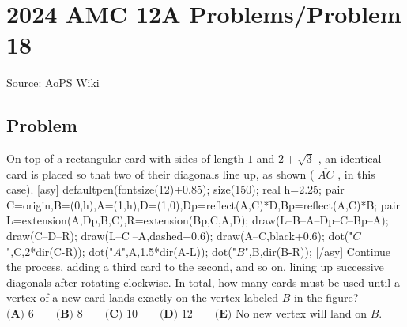 \documentclass[12pt]{article}
\begin{document}
\section*{{2024 AMC 12A Problems/Problem 18}}
Source: AoPS Wiki

\subsection*{Problem}
On top of a rectangular card with sides of length $1$ and $2+\sqrt{3}$ , an identical card is placed so that two of their diagonals line up, as shown ( $\overline{AC}$ , in this case). [asy] defaultpen(fontsize(12)+0.85); size(150); real h=2.25; pair C=origin,B=(0,h),A=(1,h),D=(1,0),Dp=reflect(A,C)*D,Bp=reflect(A,C)*B; pair L=extension(A,Dp,B,C),R=extension(Bp,C,A,D); draw(L--B--A--Dp--C--Bp--A); draw(C--D--R); draw(L--C^^R--A,dashed+0.6); draw(A--C,black+0.6); dot("$C$",C,2*dir(C-R)); dot("$A$",A,1.5*dir(A-L)); dot("$B$",B,dir(B-R)); [/asy] Continue the process, adding a third card to the second, and so on, lining up successive diagonals after rotating clockwise. In total, how many cards must be used until a vertex of a new card lands exactly on the vertex labeled $B$ in the figure? $\textbf{(A) }6\qquad\textbf{(B) }8\qquad\textbf{(C) }10\qquad\textbf{(D) }12\qquad\textbf{(E) }\text{No new vertex will land on }B.$
\end{document}

